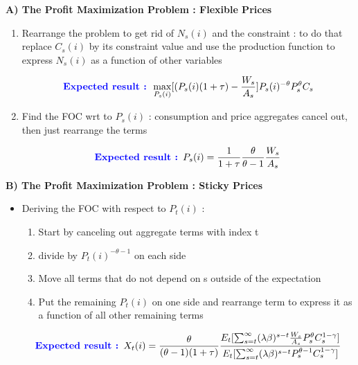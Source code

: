 \documentclass{article}
\begin{document}
\textbf{A) The Profit Maximization Problem : Flexible Prices}
\begin{enumerate}
    \item Rearrange the problem to get rid of $N_s(i)$ and the constraint : to do that replace $C_s(i)$ by its constraint value and use the production function to express $N_s(i)$ as a function of other variables 
    \begin{expectedresultsbox}
    \begin{equation}
        \textcolor{blue}{\textbf{Expected result : }} \max_{P_s(i)} [(P_s(i)(1+\tau) - \frac{W_s}{A_s}]P_s(i)^{-\theta}P_s^{\theta}C_s
    \end{equation}
    \end{expectedresultsbox}
    \item Find the FOC wrt to $P_s(i)$ : consumption and price aggregates cancel out, then just rearrange the terms
    \begin{expectedresultsbox}
    \begin{equation}
        \textcolor{blue}{\textbf{Expected result : }} P_s(i) = \frac{1}{1+\tau}\frac{\theta}{\theta-1}\frac{W_s}{A_s}
    \end{equation}
    \end{expectedresultsbox}
\end{enumerate}

\textbf{B) The Profit Maximization Problem : Sticky Prices}
\begin{itemize}
    \item Deriving the FOC with respect to $P_t(i)$ : 
    \begin{enumerate}
        \item Start by canceling out aggregate terms with index t 
        \item divide by $P_t(i)^{-\theta-1}$ on each side
        \item Move all terms that do not depend on s outside of the expectation 
        \item Put the remaining $P_t(i)$ on one side and rearrange term to express it as a function of all other remaining terms
    \end{enumerate}
    \begin{expectedresultsbox}
    \begin{equation}
        \textcolor{blue}{\textbf{Expected result : }} X_t(i) = \frac{\theta}{(\theta-1)(1+\tau)}\frac{E_t[\sum_{s=t}^\infty(\lambda\beta)^{s-t}\frac{W_s}{A_s}P_s^{\theta}C_s^{1-\gamma}]}{E_t[\sum_{s=t}^{\infty}(\lambda\beta)^{s-t}P_s^{\theta-1}C_s^{1-\gamma}]}
    \end{equation}
    \end{expectedresultsbox}
\end{itemize}
\end{document}
